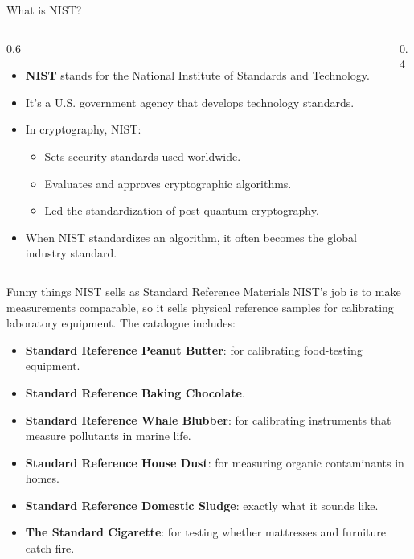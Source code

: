 \ifdefined\PRESENTATION\else\PassOptionsToClass{handout}{beamer}\fi\documentclass[aspectratio=169, lualatex]{beamer}
\begin{document}
\begin{frame}{What is NIST?}
	\begin{columns}[c]
		\begin{column}{0.6\textwidth}
			\begin{itemize}[<+->]
				\item \textbf{NIST} stands for the National Institute of Standards and Technology.
				\item It's a U.S. government agency that develops technology standards.
				\item In cryptography, NIST:
				      \begin{itemize}
					      \item Sets security standards used worldwide.
					      \item Evaluates and approves cryptographic algorithms.
					      \item Led the standardization of post-quantum cryptography.
				      \end{itemize}
				\item When NIST standardizes an algorithm, it often becomes the global industry standard.
			\end{itemize}
		\end{column}
		\begin{column}{0.4\textwidth}
		\end{column}
	\end{columns}
\end{frame}

\begin{frame}{Funny things NIST sells as Standard Reference Materials}
	NIST's job is to make measurements comparable, so it sells physical reference samples for calibrating laboratory equipment. The catalogue includes:
	\begin{itemize}[<+->]
		\item \textbf{Standard Reference Peanut Butter}: for calibrating food-testing equipment.
		\item \textbf{Standard Reference Baking Chocolate}.
		\item \textbf{Standard Reference Whale Blubber}: for calibrating instruments that measure pollutants in marine life.
		\item \textbf{Standard Reference House Dust}: for measuring organic contaminants in homes.
		\item \textbf{Standard Reference Domestic Sludge}: exactly what it sounds like.
		\item \textbf{The Standard Cigarette}: for testing whether mattresses and furniture catch fire.
	\end{itemize}
\end{frame}
\end{document}
